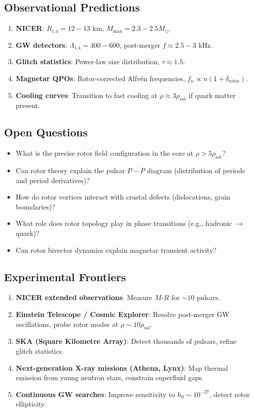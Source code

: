 \documentclass[12pt,a4paper]{article}
\theoremstyle{definition}
\theoremstyle{remark}
\begin{document}
\subsection{Observational Predictions}

\begin{enumerate}
\item \textbf{NICER}: $R_{1.4} = 12-13$ km, $M_{\text{max}} = 2.3-2.5 M_\odot$.
\item \textbf{GW detectors}: $\Lambda_{1.4} = 400-600$, post-merger $f \approx 2.5-3$ kHz.
\item \textbf{Glitch statistics}: Power-law size distribution, $\tau \approx 1.5$.
\item \textbf{Magnetar QPOs}: Rotor-corrected Alfvén frequencies, $f_n \propto n(1 + \delta_{\text{rotor}})$.
\item \textbf{Cooling curves}: Transition to fast cooling at $\rho \approx 3\rho_{\text{sat}}$ if quark matter present.
\end{enumerate}

\subsection{Open Questions}

\begin{itemize}
\item What is the precise rotor field configuration in the core at $\rho > 5\rho_{\text{sat}}$?
\item Can rotor theory explain the pulsar $P-\dot{P}$ diagram (distribution of periods and period derivatives)?
\item How do rotor vortices interact with crustal defects (dislocations, grain boundaries)?
\item What role does rotor topology play in phase transitions (e.g., hadronic $\to$ quark)?
\item Can rotor bivector dynamics explain magnetar transient activity?
\end{itemize}

\subsection{Experimental Frontiers}

\begin{enumerate}
\item \textbf{NICER extended observations}: Measure $M$-$R$ for $\sim 10$ pulsars.
\item \textbf{Einstein Telescope / Cosmic Explorer}: Resolve post-merger GW oscillations, probe rotor modes at $\rho \sim 10\rho_{\text{sat}}$.
\item \textbf{SKA (Square Kilometre Array)}: Detect thousands of pulsars, refine glitch statistics.
\item \textbf{Next-generation X-ray missions (Athena, Lynx)}: Map thermal emission from young neutron stars, constrain superfluid gaps.
\item \textbf{Continuous GW searches}: Improve sensitivity to $h_0 \sim 10^{-27}$, detect rotor ellipticity.
\end{enumerate}
\end{document}
